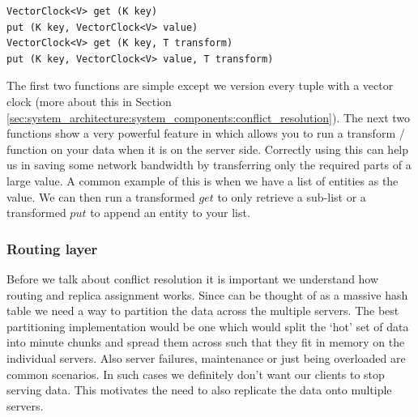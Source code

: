 \documentclass[10pt,twocolumn,preprint,natbib,authoryear]{sigplanconf}
\begin{document}
\scriptsize
\begin{verbatim}
VectorClock<V> get (K key)
put (K key, VectorClock<V> value)
VectorClock<V> get (K key, T transform)
put (K key, VectorClock<V> value, T transform)
\end{verbatim}
\normalsize

The first two functions are simple except we version every tuple with a vector clock (more about this in Section \ref{sec:system_architecture:system_components:conflict_resolution}). The next two functions show a very powerful feature in \projectname{} which allows you to run a transform / function on your data when it is on the server side. Correctly using this can help us in saving some network bandwidth by transferring only the required parts of a large value. A common example of this is when we have a list of entities as the value. We can then run a transformed $get$ to only retrieve a sub-list or a transformed $put$ to append an entity to your list. 


\subsubsection {Routing layer }  
\label{sec:system_architecture:system_components:routing_layer}

Before we talk about conflict resolution it is important we understand how routing and replica assignment works. Since \projectname{} can be thought of as a massive hash table we need a way to partition the data across the multiple servers. The best partitioning implementation would be one which would split the `hot' set of data into minute chunks and spread them across such that they fit in memory on the individual servers. Also server failures, maintenance or just being overloaded are common scenarios. In such cases we definitely don't want our clients to stop serving data. This motivates the need to also replicate the data onto multiple servers. 
\end{document}
